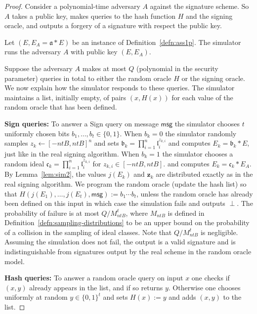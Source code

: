 \documentclass{llncs}
\newcommand{\msg}{\textsf{msg}}
\renewcommand{\a}{\mathfrak{a}}
\renewcommand{\b}{\mathfrak{b}}
\renewcommand{\c}{\mathfrak{c}}
\renewcommand{\l}{\mathfrak{l}}
\newcommand{\z}{\textbf{z}}
\begin{document}
\begin{proof}
Consider a polynomial-time adversary $A$ against the signature scheme. So $A$ takes a public key, makes queries to the hash function $H$ and the signing oracle, and outputs a forgery of a signature with respect the public key.

Let $(E, E_A = \a * E )$ be an instance of Definition~\ref{defn:ass1p}.
The simulator runs the adversary $A$ with public key $(E, E_A)$.

Suppose the adversary $A$ makes at most $Q$ (polynomial in the security parameter) queries in total to either the random oracle $H$ or the signing oracle. We now explain how the simulator responds to these queries. The simulator maintains a list, initially empty, of pairs $(x, H(x))$ for each value of the random oracle that has been defined.

\vskip 0.1cm

\noindent \textbf{Sign queries:}
To answer a Sign query on message $\msg$ the simulator chooses 
$t$ uniformly chosen bits $b_1, \dots, b_t \in \{0,1\}$.
When $b_k = 0$ the simulator randomly samples $z_k \leftarrow [-ntB,ntB]^n$ and sets $\b_k = \prod_{i=1}^n \l_i^{z_{k,i}}$ and computes $E_k = \b_k * E$, just like in the real signing algorithm.
When $b_k = 1$ the simulator chooses a random ideal $\c_k = \prod_{i=1}^n \l_i^{z_{k,i}}$ for $z_{k,i} \in [-ntB, ntB]$.
and computes $E_k = \c_k * E_A$.
By Lemma~\ref{lem:sim2}, the values $j( E_k )$ and $\z_k$ are distributed exactly as in the real signing algorithm.
We program the random oracle (update the hash list) so that $H( j( E_1), \dots, j(E_t), \msg ) := b_1 \cdots b_t$, unless the random oracle has already been defined on this input in which case the simulation fails and outputs $\perp$.
The probability of failure is at most $Q/M_{ntB}^t$, 
where $M_{ntB}$ is defined in Definition~\ref{defn:sampling-distributions} to be an upper bound on the probability of a collision in the sampling of ideal classes.
Note that $Q/M_{ntB}^t$ is negligible.
Assuming the simulation does not fail, the output is a valid signature and is indistinguishable from signatures output by the real scheme in the random oracle model.

\vskip 0.1cm

\noindent \textbf{Hash queries:}
To answer a random oracle query on input $x$ one checks if $(x,y)$ already appears in the list, and if so returns $y$. Otherwise one chooses uniformly at random $y \in \{0,1\}^t$ and sets $H(x) := y$ and adds $(x,y)$ to the list.


\end{proof}
\end{document}
